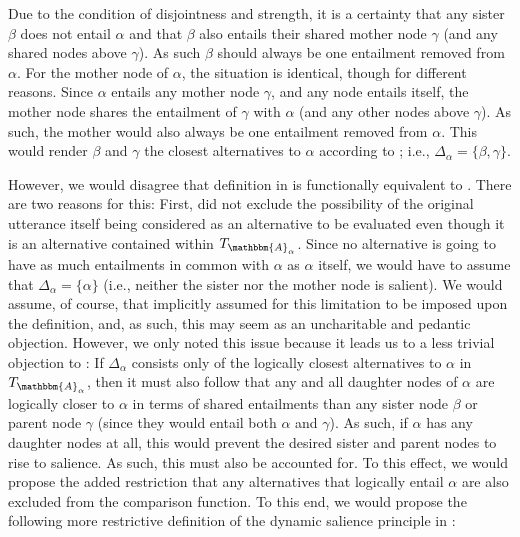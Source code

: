 \noindent Due to the condition of disjointness and strength, it is a certainty that any sister $\beta$ does not entail $\alpha$ and that $\beta$ also entails their shared mother node $\gamma$ (and any shared nodes above $\gamma$). As such $\beta$ should always be one entailment removed from $\alpha$. For the mother node of $\alpha$, the situation is identical, though for different reasons. Since $\alpha$ entails any mother node $\gamma$, and any node entails itself, the mother node shares the entailment of $\gamma$ with $\alpha$ (and any other nodes above $\gamma$). As such, the mother would also always be one entailment removed from $\alpha$. This would render $\beta$ and $\gamma$ the closest alternatives to $\alpha$ according to \textcite{Ippolito2020}; i.e., $\Delta_{\alpha}=\{\beta,\gamma\}$.

However, we would disagree that  definition in  is functionally equivalent to . There are two reasons for this: First, \textcite{Ippolito2020} did not exclude the possibility of the original utterance itself being considered as an alternative to be evaluated even though it is an alternative contained within $T_{\mathbbm{A}_\alpha}$. Since no alternative is going to have as much entailments in common with $\alpha$ as $\alpha$ itself, we would have to assume that $\Delta_\alpha=\{\alpha\}$ (i.e., neither the sister nor the mother node is salient). We would assume, of course, that \textcite{Ippolito2020} implicitly assumed for this limitation to be imposed upon the definition, and, as such, this may seem as an uncharitable and pedantic objection. However, we only noted this issue because it leads us to a less trivial objection to : If $\Delta_\alpha$ consists only of the logically closest alternatives to $\alpha$ in $T_{\mathbbm{A}_\alpha}$, then it must also follow that any and all daughter nodes of $\alpha$ are logically closer to $\alpha$ in terms of shared entailments than any sister node $\beta$ or parent node $\gamma$ (since they would entail both $\alpha$ and $\gamma$). As such, if $\alpha$ has any daughter nodes at all, this would prevent the desired sister and parent nodes to rise to salience. As such, this must also be accounted for. To this effect, we would propose the added restriction that any alternatives that logically entail $\alpha$ are also excluded from the comparison function. To this end, we would propose the following more restrictive definition of the dynamic salience principle in :
\ex
{}

